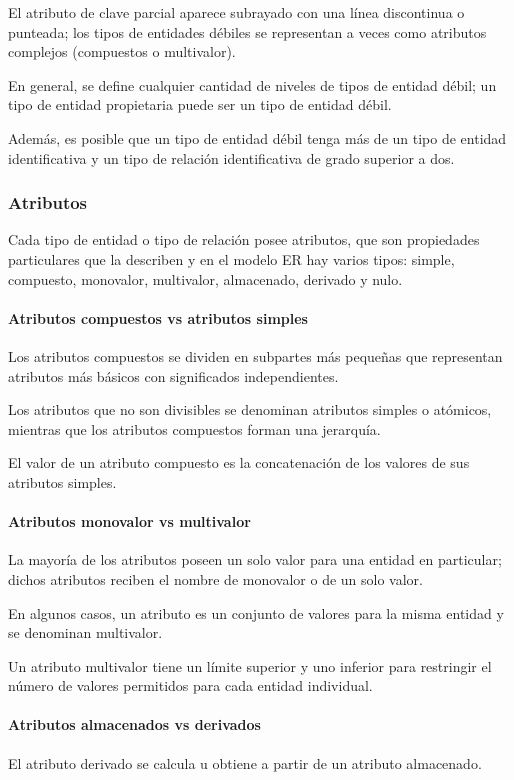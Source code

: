 El atributo de clave parcial aparece subrayado con una línea discontinua o punteada; los tipos de entidades débiles se representan a veces como atributos complejos (compuestos o multivalor). 


En general, se define cualquier cantidad de niveles de tipos de entidad débil; un tipo de entidad propietaria puede ser un tipo de entidad débil. 


Además, es posible que un tipo de entidad débil tenga más de un tipo de entidad identificativa y un tipo de relación identificativa de grado superior a dos.

\subsubsection{Atributos}
Cada tipo de entidad o tipo de relación posee atributos, que son propiedades particulares que la describen y en el modelo ER hay varios tipos: simple, compuesto, monovalor, multivalor, almacenado, derivado y nulo.


\paragraph*{Atributos compuestos vs atributos simples} 


Los atributos compuestos se dividen en subpartes más pequeñas que representan atributos más básicos con significados independientes.


Los atributos que no son divisibles se denominan atributos simples o atómicos, mientras que los atributos compuestos forman una jerarquía. 


El valor de un atributo compuesto es la concatenación de los valores de sus atributos simples.

\paragraph*{Atributos monovalor vs multivalor}  


La mayoría de los atributos poseen un solo valor para una entidad en particular; dichos atributos reciben el nombre de monovalor o de un solo valor. 


En algunos casos, un atributo es un conjunto de valores para la misma entidad y se denominan multivalor.


Un atributo multivalor tiene un límite superior y uno inferior para restringir el número de valores permitidos para cada entidad individual.


\paragraph*{Atributos almacenados vs derivados}
El atributo derivado se calcula u obtiene a partir de un atributo almacenado.


